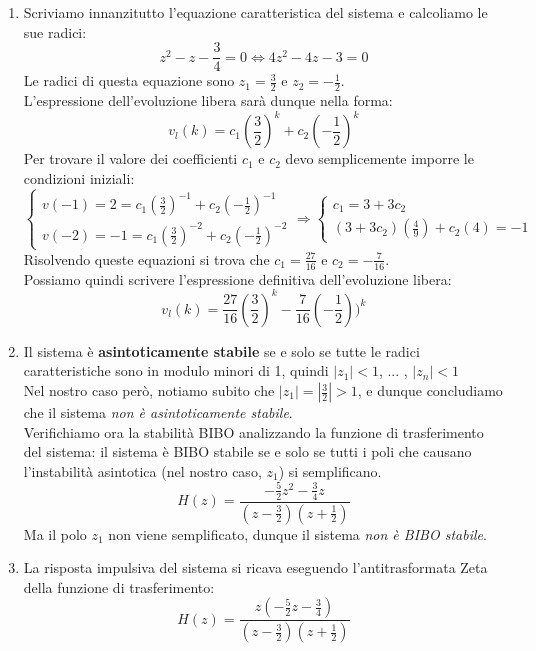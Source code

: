 \documentclass[12pt,a4paper]{article}
\begin{document}
	\begin{enumerate}
	\item Scriviamo innanzitutto l'equazione caratteristica del sistema e calcoliamo le sue radici:
	\[
		z^2-z-\frac{3}{4} = 0
		\Longleftrightarrow
		4z^2-4z-3 = 0
	\]
	Le radici di questa equazione sono $z_1 = \frac{3}{2}$ e $z_2 = -\frac{1}{2}$.\\
	L'espressione dell'evoluzione libera sar\`a dunque nella forma:
	\[
		v_l(k) = c_1\left(\frac{3}{2}\right)^k + c_2\left(-\frac{1}{2}\right)^k
	\]
	Per trovare il valore dei coefficienti $c_1$ e $c_2$ devo semplicemente imporre le condizioni iniziali:
	\[
		\begin{cases}
		v(-1) = 2 = c_1\left(\frac{3}{2}\right)^{-1} + c_2\left(-\frac{1}{2}\right)^{-1}\\
		v(-2) = -1 = c_1\left(\frac{3}{2}\right)^{-2} + c_2\left(-\frac{1}{2}\right)^{-2}
		\end{cases}
		\Longrightarrow
		\begin{cases}
		c_1 = 3 + 3c_2\\
		(3+3c_2)\left(\frac{4}{9}\right) + c_2(4) = -1
		\end{cases}
	\]
	Risolvendo queste equazioni si trova che $c_1 = \frac{27}{16}$ e $c_2 = -\frac{7}{16}$.\\
	Possiamo quindi scrivere l'espressione definitiva dell'evoluzione libera:
	\[
		v_l(k) = \frac{27}{16}\left(\frac{3}{2}\right)^k -\frac{7}{16}\left(-\frac{1}{2}\right))^k
	\]
	\item Il sistema è \textbf{asintoticamente stabile} se e solo se tutte le radici caratteristiche sono in modulo minori di 1, quindi $|z_1| < 1$, ... , $|z_n| < 1$\\
	Nel nostro caso per\`o, notiamo subito che $|z_1| = |\frac{3}{2}| > 1$, e dunque concludiamo che il sistema \textit{non è asintoticamente stabile}.\\
	Verifichiamo ora la stabilit\`a BIBO analizzando la funzione di trasferimento del sistema: il sistema \`e BIBO stabile se e solo se tutti i poli che causano l'instabilit\`a asintotica (nel nostro caso, $z_1$) si semplificano.
	\[
		H(z) = \frac{-\frac{5}{2}z^2 - \frac{3}{4}z}{\left(z-\frac{3}{2}\right) \left(z+\frac{1}{2}\right)}
	\]
	Ma il polo $z_1$ non viene semplificato, dunque il sistema \textit{non \`e BIBO stabile}.
	\item La risposta impulsiva del sistema si ricava eseguendo l'antitrasformata Zeta della funzione di trasferimento:
	\[
		H(z) = \frac{z\left(-\frac{5}{2}z - \frac{3}{4}\right)}{\left(z-\frac{3}{2}\right)\left(z+\frac{1}{2}\right)}
\]
\end{enumerate}
\end{document}
